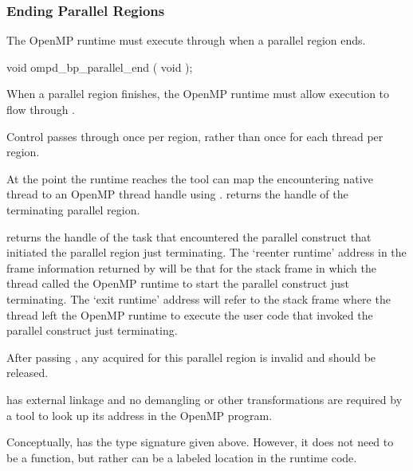 \subsubsection{Ending Parallel Regions}
\label{subsubsec:ompd_bp_parallel_end}

The OpenMP runtime must execute through 
when a parallel region ends.


\begin{cspecific}
\begin{ompSyntax}
void ompd_bp_parallel_end ( void );
\end{ompSyntax}
\end{cspecific}


\descr

When a parallel region finishes, the OpenMP runtime must allow execution
to flow through .

Control passes through 
once per region, rather than once for each thread per region.

At the point the runtime reaches 
the tool can map the encountering native thread
to an OpenMP thread handle using .
returns the handle of the terminating parallel region.

returns the handle of the task that encountered the
parallel construct that initiated the parallel region just
terminating.
The `reenter runtime' address in the frame information returned by
will be that for the stack frame in which the thread called the
OpenMP runtime to start the parallel construct just terminating.
The `exit runtime' address will refer to the stack frame where the
thread left the OpenMP runtime to execute the user code that
invoked the parallel construct just terminating.

After passing , any  acquired for this
parallel region is invalid and should be released.

\restrictions

 has external  linkage and no
demangling or other transformations are required by a tool
to look up its address in the OpenMP program.

Conceptually,  has the type signature
given above.
However, it does not need to be a function, but rather can be a labeled location
in the runtime code.

